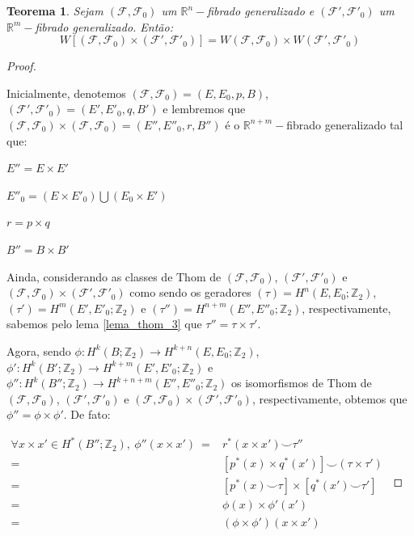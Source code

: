 \documentclass[12pt,oneside]{book} %
\newtheorem{teo}    {\hspace{0.5cm}Teorema}[chapter]
\newcommand{\R}{\mathbb{R}}
\newcommand{\Z}{\mathbb{Z}}
\newcommand{\ccup}{\smile}
\begin{document}
\begin{teo}\label{res_SW_fht_5}
	Sejam $(\mathcal{F},\mathcal{F}_{0})$ um $\R^{n}-$fibrado generalizado e $(\mathcal{F'},\mathcal{F'}_{0})$ um $\R^{m}-$fibrado generalizado. Então:
	$$ W[(\mathcal{F},\mathcal{F}_{0})\times (\mathcal{F'},\mathcal{F'}_{0})]=W(\mathcal{F},\mathcal{F}_{0})\times W(\mathcal{F'},\mathcal{F'}_{0}) $$
\end{teo}
\begin{proof}
	
	\
	
	\par Inicialmente, denotemos $(\mathcal{F},\mathcal{F}_{0})=(E,E_{0},p,B)$, $(\mathcal{F'},\mathcal{F'}_{0})=(E',E'_{0},q,B')$ e lembremos que $(\mathcal{F},\mathcal{F}_{0})\times (\mathcal{F},\mathcal{F}_{0})=(E'',E''_{0},r,B'')$ é o $\R^{n+m}-$fibrado generalizado tal que: \newline
	
	$E''=E\times E'$
	
	$E''_{0}=(E\times E'_{0})\bigcup (E_{0}\times E')$
	
	$r=p\times q$
	
	$B''=B\times B'$ \newline
	
	\par Ainda, considerando as classes de Thom de $(\mathcal{F},\mathcal{F}_{0})$, $(\mathcal{F'},\mathcal{F'}_{0})$ e $(\mathcal{F},\mathcal{F}_{0})\times (\mathcal{F'},\mathcal{F'}_{0})$ como sendo os geradores $(\tau)=H^{n}(E,E_{0};\Z_{2})$, $(\tau')=H^{m}(E',E'_{0};\Z_{2})$ e $(\tau'')=H^{n+m}(E'',E''_{0};\Z_{2})$, respectivamente, sabemos pelo lema \ref{lema_thom_3} que $\tau''=\tau\times\tau'$.
	
	\par Agora, sendo $\phi:H^{k}(B;\Z_{2})\to H^{k+n}(E,E_{0};\Z_{2})$, $\phi':H^{k}(B';\Z_{2})\to H^{k+m}(E',E'_{0};\Z_{2})$ e $\phi'':H^{k}(B'';\Z_{2})\to H^{k+n+m}(E'',E''_{0};\Z_{2})$ os isomorfismos de Thom de $(\mathcal{F},\mathcal{F}_{0})$, $(\mathcal{F'},\mathcal{F'}_{0})$ e $(\mathcal{F},\mathcal{F}_{0})\times (\mathcal{F'},\mathcal{F'}_{0})$, respectivamente, obtemos que $\phi''=\phi\times\phi'$. De fato: \newline
	
	$\begin{array}{rl}
		\forall x\times x'\in H^{*}(B'';\Z_{2}), \ \phi''(x\times x') \ = & r^{*}(x\times x')\ccup \tau'' \\
		= & [p^{*}(x)\times q^{*}(x')]\ccup (\tau\times \tau') \\
		= & [p^{*}(x)\ccup \tau]\times [q^{*}(x')\ccup \tau'] \\
		= & \phi(x)\times \phi'(x') \\
		= & (\phi\times\phi')(x\times x')
	\end{array}$ \newline
	

\end{proof}
\end{document}
